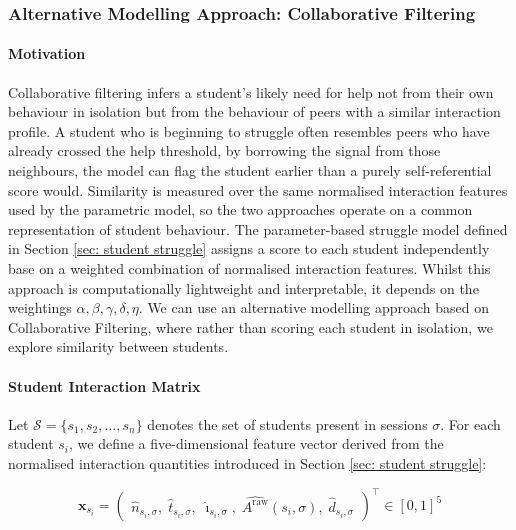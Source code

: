 \subsubsection{Alternative Modelling Approach: Collaborative Filtering} \label{sec: collaborative filtering}

\paragraph{Motivation}
Collaborative filtering infers a student's likely need for help not from their own behaviour in isolation but from the behaviour of peers with a similar interaction profile. 
A student who is beginning to struggle often resembles peers who have already crossed the help threshold, by borrowing the signal from those neighbours, the model can flag the student earlier than a purely self-referential score would. Similarity is measured over the same normalised interaction features used by the parametric model, so the two approaches operate on a common representation of student behaviour.
The parameter-based struggle model defined in Section \ref{sec: student struggle} assigns a score to each student independently base on a weighted combination of normalised interaction features. Whilst this approach is computationally lightweight and interpretable, it depends on the weightings  $\alpha, \beta, \gamma, \delta, \eta$. We can use an alternative modelling approach based on Collaborative Filtering, where rather than scoring each student in isolation, we explore similarity between students.


\paragraph{Student Interaction Matrix}

Let $\mathcal{S} = \{s_1,s_2,\ldots, s_n\}$ denotes the set of students present in sessions $\sigma$. For each student $s_i$, we define a five-dimensional feature vector derived from the normalised interaction quantities introduced in Section \ref{sec: student struggle}:

\begin{equation}
    \mathbf{x}_{s_i} =
    \begin{pmatrix}
        \hat{n}_{s_i,\sigma},\;
        \hat{t}_{s_i,\sigma},\;
        \hat{\imath}_{s_i,\sigma},\;
        \widehat{A^{\mathrm{raw}}}(s_i, \sigma),\;
        \hat{d}_{s_i,\sigma}
    \end{pmatrix}^{\top}
    \in [0,1]^5
\end{equation}

